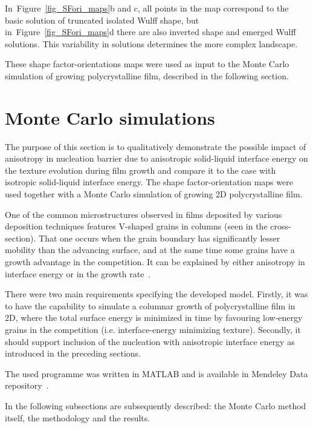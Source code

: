 	In~Figure~\ref{fig_SFori_maps}b and c, all points in the map correspond to the basic solution of truncated isolated Wulff shape, but in~Figure~\ref{fig_SFori_maps}d there are also inverted shape and emerged Wulff solutions. This variability in solutions determines the more complex landscape.
	
	These shape factor-orientations maps were used as input to the Monte Carlo simulation of growing polycrystalline film, described in the following section.

\section{Monte Carlo simulations}\label{sec_MC}
The purpose of this section is to qualitatively demonstrate the possible impact of anisotropy in nucleation barrier due to anisotropic solid-liquid interface energy on the texture evolution during film growth and compare it to the case with isotropic solid-liquid interface energy. The shape factor-orientation maps were used together with a Monte Carlo simulation of growing 2D polycrystalline film.

One of the common microstructures observed in films deposited by various deposition techniques features V-shaped grains in columns (seen in the cross-section). That one occurs when the grain boundary has significantly lesser mobility than the advancing surface, and at the same time some grains have a growth advantage in the competition. It can be explained by either anisotropy in interface energy or in the growth rate~\cite{Wendler2011}. 

There were two main requirements specifying the developed model. Firstly, it was to have the capability to simulate a columnar growth of polycrystalline film in 2D, where the total surface energy is minimized in time by favouring low-energy grains in the competition (i.e. interface-energy minimizing texture). Secondly, it should support inclusion of the nucleation with anisotropic interface energy as introduced in the preceding sections. 

The used programme was written in MATLAB and is available in Mendeley Data repository~\cite{Minar2023dataset}.

In the following subsections are subsequently described: the Monte Carlo method itself, the methodology and the results.

